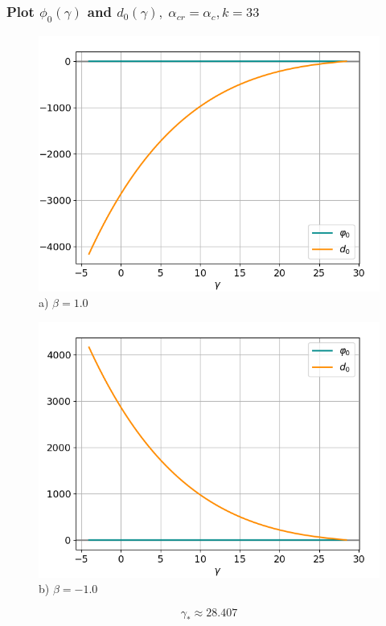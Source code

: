 \documentclass[fullscreen=true, unicode, bookmarks=false]{beamer}
\begin{document}
\begin{frame}
\frametitle{ Plot $ \phi_0(\gamma) $ and $ d_0(\gamma), \; \alpha_{cr} = \alpha_c, k = 33 $ }

\begin{figure} 
\begin{minipage}[h]{0.49\linewidth}
\begin{center}
\includegraphics[scale=0.37]{oscillating_phi0d0_x0_067_beta_10.png} \\ {\scriptsize a) $ \beta = 1.0 $}
\end{center}
\end{minipage} 
\hfill
\begin{minipage}[h]{0.49\linewidth}
\begin{center}
\includegraphics[scale=0.37]{oscillating_phi0d0_x0_067_beta_-10.png}  \\ {\scriptsize b) $ \beta = -1.0 $}
\end{center}
\end{minipage} 
\end{figure}
$$ \gamma_* \approx 28.407 $$

\end{frame}
\end{document}
